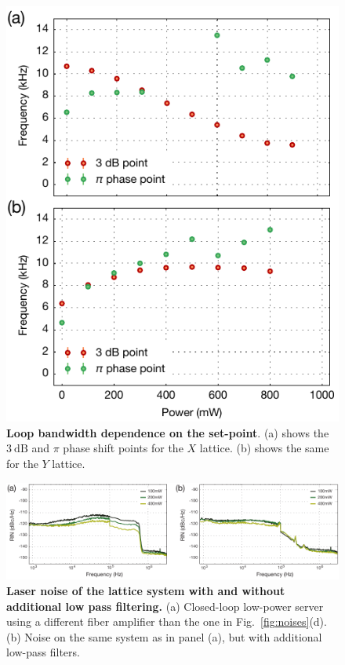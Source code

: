 \documentclass[twocolumn,aip,rsi,reprint,bibnotes]{revtex4-1}
\newcommand\unit[2]{\ensuremath{#1~\mathrm{{#2}}}}
\begin{document}
\begin{figure}
  \begin{center}
    \includegraphics{Figure10.pdf}
    \caption{\textbf{Loop bandwidth dependence on the set-point}. (a) shows the \unit{3}{dB} and $\pi$ phase shift points for the $X$ lattice. (b) shows the same for the $Y$ lattice.}\label{fig:bandwidth}
  \end{center}
\end{figure}

\begin{figure}
  \begin{center}
    \includegraphics{Figure11.pdf}
    \caption{\textbf{Laser noise of the lattice system with and without additional low pass filtering.} (a) Closed-loop low-power server using a different fiber amplifier than the one in Fig.~\ref{fig:noises}(d). (b) Noise on the same system as in panel (a), but with additional low-pass filters.}\label{fig:low_pass_noises}
  \end{center}
\end{figure}
\end{document}
